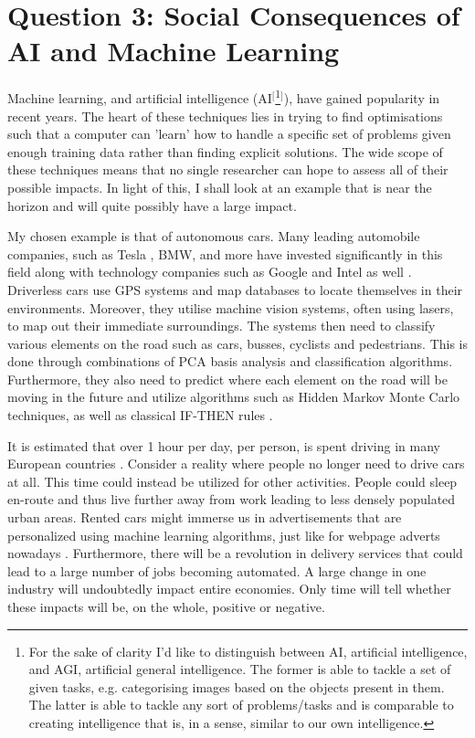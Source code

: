 \documentclass{article}
\begin{document}
\newpage
\section{Question 3: Social Consequences of AI and Machine Learning}

Machine learning, and artificial intelligence (AI$^[$\footnote{For the sake of clarity I'd like to distinguish between AI, artificial intelligence, and AGI, artificial general intelligence. The former is able to tackle a set of given tasks, e.g. categorising images based on the objects present in them. The latter is able to tackle any sort of problems/tasks and is comparable to creating intelligence that is, in a sense, similar to our own intelligence.}$^]$), have gained popularity in recent years. The heart of these techniques lies in trying to find optimisations such that a computer can 'learn' how to handle a specific set of problems given enough training data rather than finding explicit solutions. The wide scope of these techniques means that no single researcher can hope to assess all of their possible impacts. In light of this, I shall look at an example that is near the horizon and will quite possibly have a large impact. 

My chosen example is that of autonomous cars. Many leading automobile companies, such as Tesla \cite{Tesla}, BMW, and more have invested significantly in this field along with technology companies such as Google and Intel as well \cite{Waymo}. Driverless cars use GPS systems and map databases to locate themselves in their environments. Moreover, they utilise machine vision systems, often using lasers, to map out their immediate surroundings. The systems then need to classify various elements on the road such as cars, busses, cyclists and pedestrians. This is done through combinations of PCA basis analysis and classification algorithms. Furthermore, they also need to predict where each element on the road will be moving in the future and utilize algorithms such as Hidden Markov Monte Carlo techniques, as well as classical IF-THEN rules \cite{ROB:ROB20147} \cite{broggi2006single}.

 It is estimated that over 1 hour per day, per person, is spent driving in many European countries \cite{pasaoglu2012driving}. Consider a reality where people no longer need to drive cars at all. This time could instead be utilized for other activities. People could sleep en-route and thus live further away from work leading to less densely populated urban areas. Rented cars might immerse us in advertisements that are personalized using machine learning algorithms, just like for webpage adverts nowadays \cite{khan2010review}. Furthermore, there will be a revolution in delivery services that could lead to a large number of jobs becoming automated. A large change in one industry will undoubtedly impact entire economies. Only time will tell whether these impacts will be, on the whole, positive or negative. 
 
\end{document}
